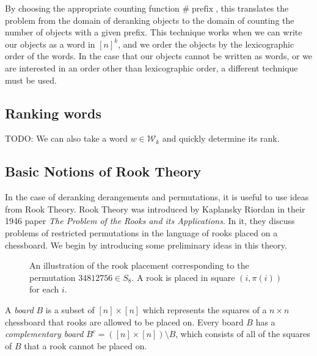 By choosing the appropriate counting function $\#\operatorname{prefix}$, this
translates the problem from the domain of deranking objects to the domain of
counting the number of objects with a given prefix. This technique works
when we can write our objects as a word in $[n]^k$, and we order the objects
by the lexicographic order of the words. In the case that our objects cannot be
written as words, or we are interested in an order other than lexicographic order,
a different technique must be used.

\subsection{Ranking words}
TODO: We can also take a word $w \in \mathcal{W}_k$ and quickly determine its
rank.

\subsection{Basic Notions of Rook Theory}
In the case of deranking derangements and permutations, it is useful to use
ideas from Rook Theory.
Rook Theory was introduced by Kaplansky \cite{Kaplansky1946} Riordan \cite{Riordan1980}
in their 1946 paper \textit{The Problem of the Rooks and its Applications}. In
it, they discuss problems of restricted permutations in the language of rooks
placed on a chessboard.
We begin by introducing some preliminary ideas in this theory.

\begin{figure}
  \center
  \caption{
    An illustration of the rook placement corresponding to the permutation
    $34812756 \in S_8$. A rook is placed in square $(i, \pi(i))$ for each $i$.
  }
\end{figure}

\begin{definition}
  A \textit{board} $B$ is a subset of $[n] \times [n]$ which represents the
  squares of a $n \times n$ chessboard that rooks are allowed to be placed on.
  Every board $B$ has a \textit{complementary board}
  $B^c = ([n] \times [n]) \setminus B$, which consists of all of the
  squares of $B$ that a rook cannot be placed on.
\end{definition}

